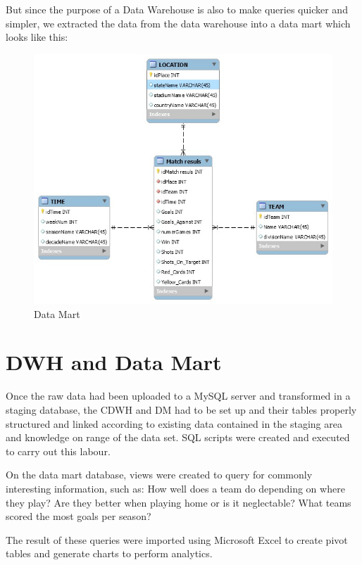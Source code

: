 \documentclass[11pt, journal]{IEEEtran}
\begin{document}
But since the purpose of a Data Warehouse is also to make queries quicker and simpler, we extracted the data from the data warehouse into a data mart which looks like this:

\begin{figure}[htb]
	\centering
		\includegraphics[width=1.0\columnwidth]{images/datamart}
	\caption{Data Mart}
	\label{fig:probov}
\end{figure}


\section{DWH and Data Mart} \label{sec:further}
Once the raw data had been uploaded to a MySQL server and transformed in a staging database, the CDWH and DM had to be set up and their tables
properly structured and linked according to existing data contained in the staging area and knowledge on range of the data set. SQL scripts were 
created and executed to carry out this labour. 

On the data mart database, views were created to query for commonly interesting information, such as: How well does a team do depending on where
they play? Are they better when playing home or is it neglectable? What teams scored the most goals per season?

The result of these queries were imported using Microsoft Excel to create pivot tables and generate charts to perform analytics.
\end{document}
